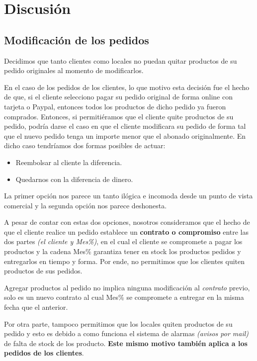 \section{Discusión}

\subsection{Modificación de los pedidos}

Decidimos que tanto clientes como locales no puedan quitar productos de su pedido originales al momento de modificarlos.

En el caso de los pedidos de los clientes, lo que motivo esta decisión fue el hecho de que, si el cliente selecciono pagar su pedido original de forma online con tarjeta o Paypal, entonces todos los productos de dicho pedido ya fueron comprados. Entonces, si permitiéramos que el cliente quite productos de su pedido, podría darse el caso en que el cliente modificara su pedido de forma tal que el nuevo pedido tenga un importe menor que el abonado originalmente. En dicho caso tendríamos dos formas posibles de actuar:

\begin{itemize}
	\item Reembolsar al cliente la diferencia.
	\item Quedarnos con la diferencia de dinero.
\end{itemize}

La primer opción nos parece un tanto ilógica e incomoda desde un punto de vista comercial y la segunda opción nos parece deshonesta.

A pesar de contar con estas dos opciones, nosotros consideramos que el hecho de que el cliente realice un pedido establece un \textbf{contrato o compromiso} entre las dos partes \textit{(el cliente y Mes\%)}, en el cual el cliente se compromete a pagar los productos y la cadena Mes\% garantiza tener en stock los productos pedidos y entregarlos en tiempo y forma. Por ende, no permitimos que los clientes quiten productos de sus pedidos.

Agregar productos al pedido no implica ninguna modificación al \textit{contrato} previo, solo es un nuevo contrato al cual Mes\% se compromete a entregar en la misma fecha que el anterior.

Por otra parte, tampoco permitimos que los locales quiten productos de su pedido y esto es debido a como funciona el sistema de alarmas \textit{(avisos por mail)} de falta de stock de los producto. \textbf{Este mismo motivo también aplica a los pedidos de los clientes}.

